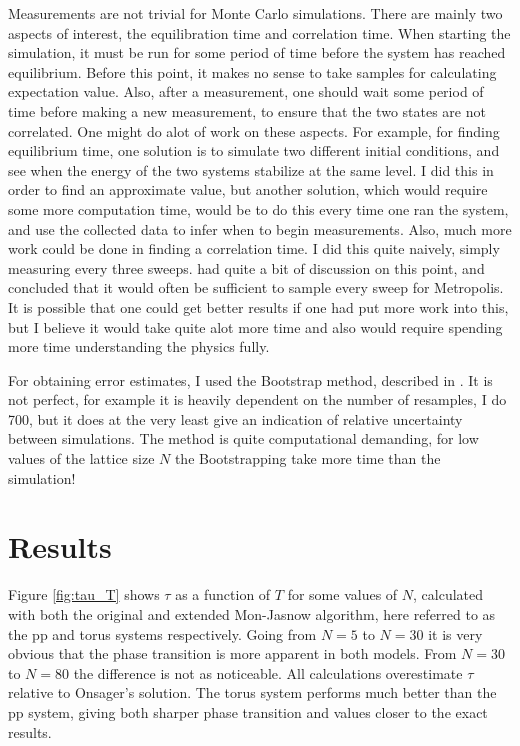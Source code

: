 \documentclass[12pt, a4paper]{article}
\begin{document}
Measurements are not trivial for Monte Carlo simulations.
There are mainly two aspects of interest, the equilibration time and correlation time.
When starting the simulation, it must be run for some period of time before the system has reached equilibrium.
Before this point, it makes no sense to take samples for calculating expectation value.
Also, after a measurement, one should wait some period of time before making a new measurement, to ensure that the two states are not correlated.
One might do alot of work on these aspects.
For example, for finding equilibrium time, one solution is to simulate two different initial conditions, and see when the energy of the two systems stabilize at the same level.
I did this in order to find an approximate value, but another solution, which would require some more computation time, would be to do this every time one ran the system, and use the collected data to infer when to begin measurements.
Also, much more work could be done in finding a correlation time.
I did this quite naively, simply measuring every three sweeps.
\cite{niels} had quite a bit of discussion on this point, and concluded that it would often be sufficient to sample every sweep for Metropolis.
It is possible that one could get better results if one had put more work into this, but I believe it would take quite alot more time and also would require spending more time understanding the physics fully.

For obtaining error estimates, I used the Bootstrap method, described in \cite{niels}.
It is not perfect, for example it is heavily dependent on the number of resamples, I do 700, but it does at the very least give an indication of relative uncertainty between simulations.
The method is quite computational demanding, for low values of the lattice size $N$ the Bootstrapping take more time than the simulation!

\section{Results}
Figure \ref{fig:tau_T} shows $\tau$ as a function of $T$ for some values of $N$, calculated with both the original and extended Mon-Jasnow algorithm, here referred to as the pp and torus systems respectively.
Going from $N=5$ to $N=30$ it is very obvious that the phase transition is more apparent in both models.
From $N=30$ to $N=80$ the difference is not as noticeable.
All calculations overestimate $\tau$ relative to Onsager's solution.
The torus system performs much better than the pp system, giving both sharper phase transition and values closer to the exact results.
\end{document}

